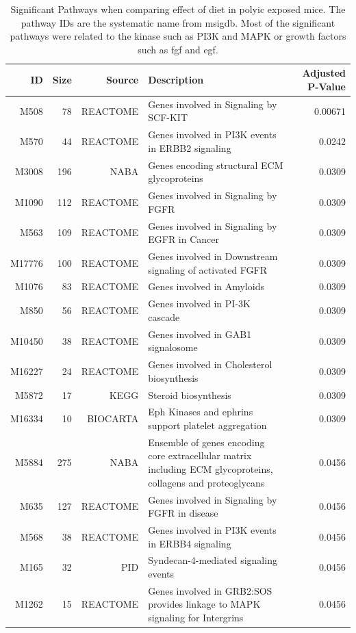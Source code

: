 \documentclass[12pt]{scrbook}
\begin{document}
\begin{landscape}
	\begin{table}
		\begin{tabular}{rrrp{10cm}r}
			\toprule
			ID&	Size&	Source&	Description&	Adjusted P-Value\\
			\midrule
			M508&	78&	REACTOME&	Genes involved in Signaling by SCF-KIT&	0.00671\\
			M570&	44&	REACTOME&	Genes involved in PI3K events in ERBB2 signaling&	0.0242\\
			M3008&	196&	NABA&	Genes encoding structural ECM glycoproteins&	0.0309\\
			M1090&	112&	REACTOME&	Genes involved in Signaling by FGFR&	0.0309\\
			M563&	109&	REACTOME&	Genes involved in Signaling by EGFR in Cancer&	0.0309\\
			M17776&	100&	REACTOME&	Genes involved in Downstream signaling of activated FGFR&	0.0309\\
			M1076&	83&	REACTOME&	Genes involved in Amyloids&	0.0309\\
			M850&	56&	REACTOME&	Genes involved in PI-3K cascade&	0.0309\\
			M10450&	38&	REACTOME&	Genes involved in GAB1 signalosome&	0.0309\\
			M16227&	24&	REACTOME&	Genes involved in Cholesterol biosynthesis&	0.0309\\
			M5872&	17&	KEGG&	Steroid biosynthesis&	0.0309\\
			M16334&	10&	BIOCARTA&	Eph Kinases and ephrins support platelet aggregation&	0.0309\\
			M5884&	275&	NABA&	Ensemble of genes encoding core extracellular matrix including ECM glycoproteins, collagens and proteoglycans&	0.0456\\
			M635&	127&	REACTOME&	Genes involved in Signaling by FGFR in disease&	0.0456\\
			M568&	38&	REACTOME&	Genes involved in PI3K events in ERBB4 signaling&	0.0456\\
			M165&	32&	PID&	Syndecan-4-mediated signaling events&	0.0456\\
			M1262&	15&	REACTOME&	Genes involved in GRB2:SOS provides linkage to MAPK signaling for Intergrins&	0.0456\\
			\bottomrule
		\end{tabular}
		\caption[Significant Pathways When Comparing Effect of Diet in PolyI:C Exposed Mouse]{Significant Pathways when comparing effect of diet in \gls{polyic} exposed mice.
			The pathway IDs are the systematic name from \gls{msigdb}.
			Most of the significant pathways were related to the kinase such as PI3K and MAPK or growth factors such as \gls{fgf} and \gls{egf}.
		}
		\label{tab:o6polyPath}
	\end{table}
	

\end{landscape}
\end{document}
